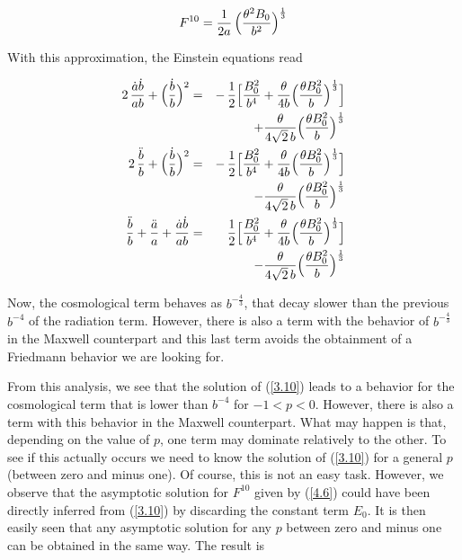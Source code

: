 \documentclass[a4paper,twocolumn,prd,superscriptaddress,nofootinbib,showpacs]
{revtex4}
\begin{document}
\begin{equation}
F^{10}=\frac{1}{2a}\,\Bigl(\frac{\theta^2B_0}{b^2}\Bigr)^\frac{1}{3}
\label{4.6}
\end{equation}

\noindent
With this approximation, the Einstein equations read

\begin{eqnarray}
2\,\frac{\dot a\dot b}{ab}
+\Bigl(\frac{\dot b}{b}\Bigr)^2
&=&-\,\frac{1}{2}\Bigl[\frac{B_0^2}{b^4}
+\frac{\theta}{4b}
\Bigl(\frac{\theta B_0^2}{b}\Bigr)^\frac{1}{3}\Bigr]
\nonumber\\
&&+\frac{\theta}{4\sqrt2\,b}
\Bigl(\frac{\theta B_0^2}{b}\Bigr)^\frac{1}{3}
\label{4.7}\\
2\,\frac{\ddot b}{b}
+\Bigl(\frac{\dot b}{b}\Bigr)^2
&=&-\,\frac{1}{2}\Bigl[\frac{B_0^2}{b^4}
+\frac{\theta}{4b}
\Bigl(\frac{\theta B_0^2}{b}\Bigr)^\frac{1}{3}\Bigr]
\nonumber\\
&&-\frac{\theta}{4\sqrt2\,b}
\Bigl(\frac{\theta B_0^2}{b}\Bigr)^\frac{1}{3}
\label{4.8}\\
\frac{\ddot b}{b}+\frac{\ddot a}{a}+\frac{\dot a\dot b}{ab}
&=&\frac{1}{2}\Bigl[\frac{B_0^2}{b^4}
+\frac{\theta}{4b}
\Bigl(\frac{\theta B_0^2}{b}\Bigr)^\frac{1}{3}\Bigr]
\nonumber\\
&&-\frac{\theta}{4\sqrt2\,b}
\Bigl(\frac{\theta B_0^2}{b}\Bigr)^\frac{1}{3}
\label{4.9}
\end{eqnarray}

Now, the cosmological term behaves as $b^{-\frac{4}{3}}$, that
decay slower than the previous $b^{-4}$ of the radiation term.
However, there is also a term with the behavior of $b^{-\frac{4}{3}}$
in the Maxwell counterpart and this last term avoids the obtainment of
a Friedmann behavior we are looking for.

\medskip
From this analysis, we see that the solution of (\ref{3.10}) leads to
a behavior for the cosmological term that is lower than $b^{-4}$ for
$-1<p<0$. However, there is also a term with this behavior in the
Maxwell counterpart. What may happen is that, depending on the value
of $p$, one term may dominate relatively to the other. To see if this
actually occurs we need to know the solution of (\ref{3.10}) for a
general $p$ (between zero and minus one). Of course, this is not an
easy task. However, we observe that the asymptotic solution for
$F^{10}$ given by (\ref{4.6}) could have been directly inferred from
(\ref{3.10}) by discarding the constant term $E_0$. It is then easily
seen that any asymptotic solution for any $p$ between zero and minus
one can be obtained in the same way. The result is
\end{document}

